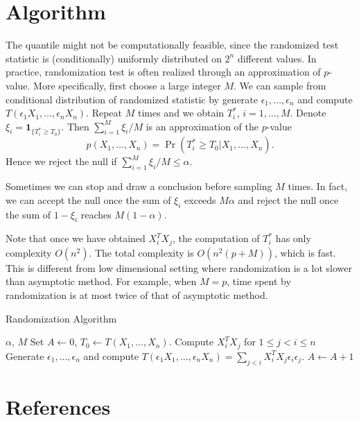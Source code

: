 \documentclass[review]{elsarticle}
\theoremstyle{plain}
\theoremstyle{definition}
\theoremstyle{remark}
\begin{document}
\section{Algorithm}

The quantile might not be computationally feasible, since the randomized test statistic is (conditionally) uniformly distributed on $2^n$ different values.
In practice, randomization test is often realized through an approximation of $p$-value.
More specifically, first choose a large integer $M$.
We can sample from conditional distribution of randomized statistic by generate $\epsilon_1,\ldots,\epsilon_n$ and compute $T(\epsilon_1 X_1,\ldots,\epsilon_n X_n)$.
Repeat $M$ times and we obtain $T_i^*$, $i=1,\ldots,M$.
Denote $\xi_i=\mathbf{1}_{\{T_i^*\geq T_0\}}$.
Then  $\sum_{i=1}^M \xi_i/M$ is an approximation of the $p$-value 
$$p(X_1,\ldots,X_n)=\Pr(T_i^*\geq T_0|X_1,\ldots,X_n).$$
Hence we reject the null if $\sum_{i=1}^M \xi_i/M\leq \alpha$.

Sometimes we can stop and draw a conclusion before sampling $M$ times.
In fact, we can accept the null once the sum of $\xi_i$ exceeds $M\alpha$ and reject the null once the sum of $1-\xi_i$ reaches $M(1-\alpha)$.

Note that once we have obtained $X_i^T X_j$, the computation of $T_i^*$ has only complexity $O(n^2)$.
The total complexity is $O(n^2 (p+M))$, which is fast.
This is different from low dimensional setting where randomization is a lot slower than asymptotic method.
For example, when $M=p$, time spent by randomization is at most twice of that of asymptotic method.









\begin{algorithm}
    \caption{Randomization Algorithm}
\label{theAlgorithm}
    \begin{algorithmic}
        \REQUIRE  $\alpha$, $M$
        \STATE Set $A\gets 0$, $T_0\gets T(X_1,\ldots,X_n)$.
        \STATE Compute $X_i^T X_j$ for $1\leq j< i\leq n$
            \STATE Generate $\epsilon_1,\ldots,\epsilon_n$ and compute $T(\epsilon_1 X_1,\ldots,\epsilon_n X_n)=\sum_{j<i} X_i^T X_j\epsilon_i\epsilon_j$.
            \STATE $A\gets A+1$
            \ENDIF
            \ENDIF
            \ENDIF
        \ENDFOR
    \end{algorithmic}
\end{algorithm}


\section*{References}


\end{document}

